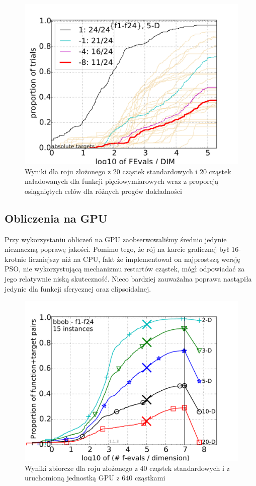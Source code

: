 \documentclass[12pt, twoside, openany, abstract=on]{report}
\theoremstyle{definition}
\begin{document}
\begin{figure}[H]
    \centering
    \includegraphics[scale=1]{charts/1node20ch20st_5D.pdf} 
 \caption{Wyniki dla roju złożonego z 20 cząstek standardowych i 20 cząstek naładowanych dla funkcji pięciowymiarowych wraz z proporcją osiągniętych celów dla różnych progów dokładności}
\end{figure}

\subsection{Obliczenia na GPU}
Przy wykorzystaniu obliczeń na GPU zaobserwowaliśmy średnio jedynie nieznaczną poprawę jakości. Pomimo tego, że rój na karcie graficznej był 16-krotnie liczniejszy niż na CPU, fakt że implementował on najprostszą wersję PSO, nie wykorzystującą mechanizmu restartów cząstek, mógł odpowiadać za jego relatywnie niską skuteczność. Nieco bardziej zauważalna poprawa nastąpiła jedynie dla funkcji sferycznej oraz elipsoidalnej. 

\begin{figure}[H]
    \centering
    \includegraphics[scale=1]{charts/1node40stGPU.pdf} 
 \caption{Wyniki zbiorcze dla roju złożonego z 40 cząstek standardowych i z uruchomioną jednostką GPU z 640 cząstkami}
\end{figure}
\end{document}
